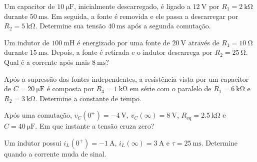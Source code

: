 \blocoaprofundamento
\begin{questao}[3]{}

Um capacitor de $\SI{10}{\micro\farad}$, inicialmente descarregado, é ligado a
$\SI{12}{\volt}$ por $R_1=\SI{2}{\kilo\ohm}$ durante
$\SI{50}{\milli\second}$. Em seguida, a fonte é removida e ele passa a
descarregar por $R_2=\SI{5}{\kilo\ohm}$. Determine sua tensão
$\SI{40}{\milli\second}$ após a segunda comutação.


\end{questao}
\begin{questao}[3]{}

Um indutor de $\SI{100}{\milli\henry}$ é energizado por uma fonte de
$\SI{20}{\volt}$ através de $R_1=\SI{10}{\ohm}$ durante
$\SI{15}{\milli\second}$. Depois, a fonte é retirada e o indutor descarrega por
$R_2=\SI{25}{\ohm}$. Qual é a corrente após mais $\SI{8}{\milli\second}$?


\end{questao}
\begin{questao}[3]{}

Após a supressão das fontes independentes, a resistência vista por um
capacitor de $C=\SI{20}{\micro\farad}$ é composta por
$R_3=\SI{1}{\kilo\ohm}$ em série com o paralelo de
$R_1=\SI{6}{\kilo\ohm}$ e $R_2=\SI{3}{\kilo\ohm}$. Determine a
constante de tempo.




\end{questao}
\begin{questao}[3]{}

Após uma comutação, $v_C(0^+)=-\SI{4}{\volt}$, $v_C(\infty)=\SI{8}{\volt}$,
$R_{\mathrm{eq}}=\SI{2.5}{\kilo\ohm}$ e $C=\SI{40}{\micro\farad}$. Em que
instante a tensão cruza zero?


\end{questao}
\begin{questao}[3]{}

Um indutor possui $i_L(0^+)=-\SI{1}{\ampere}$, $i_L(\infty)=\SI{3}{\ampere}$ e
$\tau=\SI{25}{\milli\second}$. Determine quando a corrente muda de sinal.


\end{questao}
